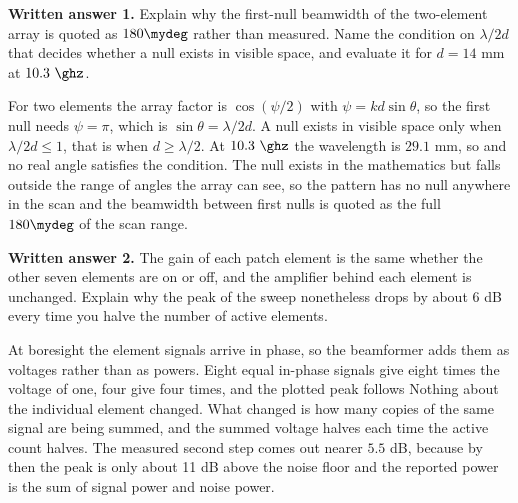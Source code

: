 \documentclass{exam}
\begin{document}
\begin{questions}
\question \textbf{Written answer 1.} Explain why the first-null beamwidth of the
two-element array is quoted as $180\mydeg$ rather than measured. Name the
condition on $\lambda/2d$ that decides whether a null exists in visible space,
and evaluate it for $d = 14$ mm at $10.3\ \ghz$.

\begin{solutionorlines}[2.6in]
For two elements the array factor is $\cos(\psi/2)$ with $\psi = kd\sin\theta$,
so the first null needs $\psi = \pi$, which is $\sin\theta = \lambda/2d$. A null
exists in visible space only when $\lambda/2d \le 1$, that is when
$d \ge \lambda/2$. At $10.3\ \ghz$ the wavelength is $29.1$ mm, so
and no real angle satisfies the condition. The null exists in the mathematics
but falls outside the range of angles the array can see, so the pattern has no
null anywhere in the scan and the beamwidth between first nulls is quoted as the
full $180\mydeg$ of the scan range.
\end{solutionorlines}

\question \textbf{Written answer 2.} The gain of each patch element is the same
whether the other seven elements are on or off, and the amplifier behind each
element is unchanged. Explain why the peak of the sweep nonetheless drops by
about 6 dB every time you halve the number of active elements.

\begin{solutionorlines}[2.4in]
At boresight the element signals arrive in phase, so the beamformer adds them as
voltages rather than as powers. Eight equal in-phase signals give eight times the
voltage of one, four give four times, and the plotted peak follows
Nothing about the individual element changed. What changed is how many copies of
the same signal are being summed, and the summed voltage halves each time the
active count halves. The measured second step comes out nearer $5.5$ dB, because
by then the peak is only about 11 dB above the noise floor and the reported power
is the sum of signal power and noise power.
\end{solutionorlines}

\newpage
{}


\end{questions}
\end{document}
